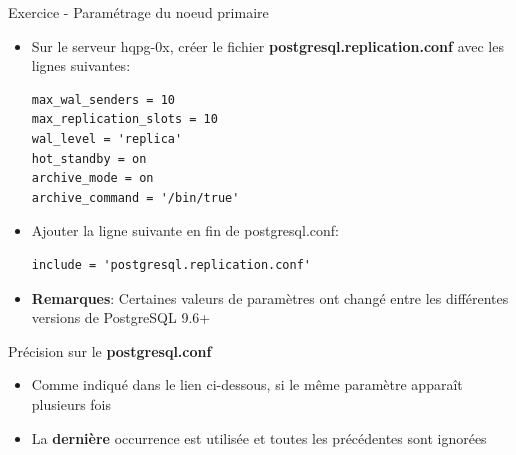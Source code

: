 
\begin{frame}[fragile]{Exercice - Paramétrage du noeud primaire}

   \begin{itemize}
      \item Sur le serveur hqpg-0x, créer le fichier \textbf{postgresql.replication.conf} avec les lignes suivantes:
\begin{tiny}
\begin{Verbatim}[commandchars=\\\{\}]
max_wal_senders = 10
max_replication_slots = 10
wal_level = 'replica'
hot_standby = on
archive_mode = on
archive_command = '/bin/true'
\end{Verbatim}
\end{tiny}
      \item Ajouter la ligne suivante en fin de postgresql.conf:
\begin{tiny}
\begin{Verbatim}[commandchars=\\\{\}]
include = 'postgresql.replication.conf'
\end{Verbatim}
\end{tiny}
      \item \textbf{Remarques}: Certaines valeurs de paramètres ont changé entre les différentes versions de PostgreSQL 9.6+
   \end{itemize}


\begin{toile}
\end{toile}

\end{frame}


\begin{frame}[fragile]{Précision sur le \textbf{postgresql.conf}}

   \begin{itemize}
      \item Comme indiqué dans le lien ci-dessous, si le même paramètre apparaît plusieurs fois
      \item La \textbf{dernière} occurrence est utilisée et toutes les précédentes sont ignorées
   \end{itemize}

\begin{toile}
\end{toile}

\end{frame}

